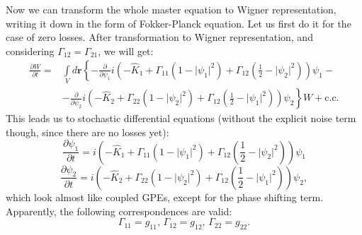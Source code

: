 \documentclass[12pt,notitlepage]{report}
\begin{document}
Now we can transform the whole master equation to Wigner representation, writing it down in the form of Fokker-Planck equation.
Let us first do it for the case of zero losses.
After transformation to Wigner representation, and considering $\Gamma_{12} = \Gamma_{21} $, we will get:
\begin{equation*}
\begin{split}
\frac{\partial W}{\partial t} = & \int\limits_V d\mathbf{r} \left\{ - \frac{\partial}{\partial \psi_1} i \left( - \hat{K}_1 +
\Gamma_{11} \left( 1 - \lvert \psi_1 \rvert^2 \right) +
\Gamma_{12} \left( \frac{1}{2} - \lvert \psi_2 \rvert^2 \right) \right) \psi_1 - \right. \\
& \left. - \frac{\partial}{\partial \psi_2} i \left( - \hat{K}_2 + \Gamma_{22} \left( 1 - \lvert \psi_2 \rvert^2 \right) +
\Gamma_{12} \left( \frac{1}{2} - \lvert \psi_1 \rvert^2 \right) \right) \psi_2 \right\} W +
\textrm{c.c.}
\end{split}
\end{equation*}
This leads us to stochastic differential equations (without the explicit noise term though, since there are no losses yet):
\[
\frac{\partial \psi_1}{\partial t} = i \left( - \hat{K}_1 + \Gamma_{11} \left( 1 - \lvert \psi_1 \rvert^2 \right) +
\Gamma_{12} \left( \frac{1}{2} - \lvert \psi_2 \rvert^2 \right) \right) \psi_1
\]
\[
\frac{\partial \psi_2}{\partial t} = i \left( - \hat{K}_2 + \Gamma_{22} \left( 1 - \lvert \psi_2 \rvert^2 \right) +
\Gamma_{12} \left( \frac{1}{2} - \lvert \psi_1 \rvert^2 \right) \right) \psi_2,
\]
which look almost like coupled GPEs, except for the phase shifting term.
Apparently, the following correspondences are valid:
\[
\Gamma_{11} = g_{11},\, \Gamma_{12} = g_{12},\, \Gamma_{22} = g_{22}.
\]
\end{document}
